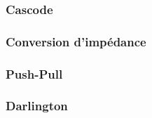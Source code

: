\documentclass[resume]{subfiles}
\begin{document}
\begin{multicols}{3}
\subsubsection{Cascode}

\subsubsection{Conversion d'impédance}

\subsubsection{Push-Pull}

\subsubsection{Darlington}

\end{multicols}
\end{document}
